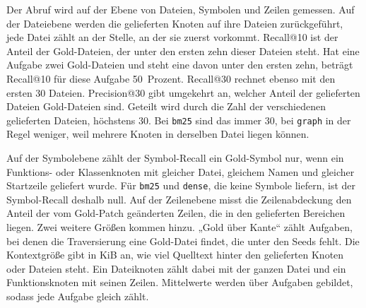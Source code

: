 Der Abruf wird auf der Ebene von Dateien, Symbolen und Zeilen gemessen. Auf der Dateiebene werden die gelieferten Knoten auf ihre Dateien zurückgeführt, jede Datei zählt an der Stelle, an der sie zuerst vorkommt. Recall@10 ist der Anteil der Gold-Dateien, der unter den ersten zehn dieser Dateien steht. Hat eine Aufgabe zwei Gold-Dateien und steht eine davon unter den ersten zehn, beträgt Recall@10 für diese Aufgabe 50~Prozent. Recall@30 rechnet ebenso mit den ersten 30 Dateien. Precision@30 gibt umgekehrt an, welcher Anteil der gelieferten Dateien Gold-Dateien sind. Geteilt wird durch die Zahl der verschiedenen gelieferten Dateien, höchstens 30. Bei \texttt{bm25} sind das immer 30, bei \texttt{graph} in der Regel weniger, weil mehrere Knoten in derselben Datei liegen können.

Auf der Symbolebene zählt der Symbol-Recall ein Gold-Symbol nur, wenn ein Funktions- oder Klassenknoten mit gleicher Datei, gleichem Namen und gleicher Startzeile geliefert wurde. Für \texttt{bm25} und \texttt{dense}, die keine Symbole liefern, ist der Symbol-Recall deshalb null. Auf der Zeilenebene misst die Zeilenabdeckung den Anteil der vom Gold-Patch geänderten Zeilen, die in den gelieferten Bereichen liegen. Zwei weitere Größen kommen hinzu. „Gold über Kante“ zählt Aufgaben, bei denen die Traversierung eine Gold-Datei findet, die unter den Seeds fehlt. Die Kontextgröße gibt in KiB an, wie viel Quelltext hinter den gelieferten Knoten oder Dateien steht. Ein Dateiknoten zählt dabei mit der ganzen Datei und ein Funktionsknoten mit seinen Zeilen. Mittelwerte werden über Aufgaben gebildet, sodass jede Aufgabe gleich zählt.

